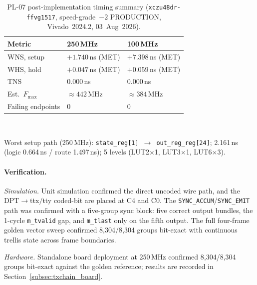 \begin{table}[!h]
  \caption{PL-07 post-implementation timing summary
           (\texttt{xczu48dr-ffvg1517}, speed-grade~$-2$ PRODUCTION,
           Vivado~2024.2, 03~Aug~2026).}
  \label{tab:pl07_timing}
  \centering
  \begin{tabular}{lll}
    \hline
    Metric                & 250\,MHz             & 100\,MHz           \\
    \hline
    WNS, setup            & $+1.740$\,ns (MET)   & $+7.398$\,ns (MET) \\
    WHS, hold             & $+0.047$\,ns (MET)   & $+0.059$\,ns (MET) \\
    TNS                   & 0.000\,ns            & 0.000\,ns          \\
    Est.\ $F_{\max}$      & $\approx 442$\,MHz   & $\approx 384$\,MHz \\
    Failing endpoints     & 0                    & 0                  \\
    \hline
  \end{tabular}\\[4pt]
  \begin{minipage}{\linewidth}
    \small
    Worst setup path (250\,MHz): \texttt{state\_reg[1]}~$\to$~\texttt{out\_reg\_reg[24]};
    2.161\,ns (logic 0.664\,ns / route 1.497\,ns);
    5 levels (LUT2$\times$1, LUT3$\times$1, LUT6$\times$3).
  \end{minipage}
\end{table}

\FloatBarrier


\paragraph{Verification.}

\textit{Simulation.}
Unit simulation confirmed the direct uncoded wire path,
and the DPT$\to$\ac{ttx}$/$\ac{tty} coded-bit are placed
at C4 and C0.
The \texttt{SYNC\_ACCUM}/\texttt{SYNC\_EMIT} path was confirmed with
a five-group sync block: five correct output bundles, the 1-cycle
\texttt{m\_tvalid} gap, and \texttt{m\_tlast} only on the fifth
output.
The full four-frame golden vector sweep confirmed 8{,}304/8{,}304
groups bit-exact with continuous trellis state across frame boundaries.

\textit{Hardware.}
Standalone board deployment at 250\,MHz confirmed 8{,}304/8{,}304
groups bit-exact against the golden reference; results are recorded
in Section~\ref{subsec:txchain_board}.

